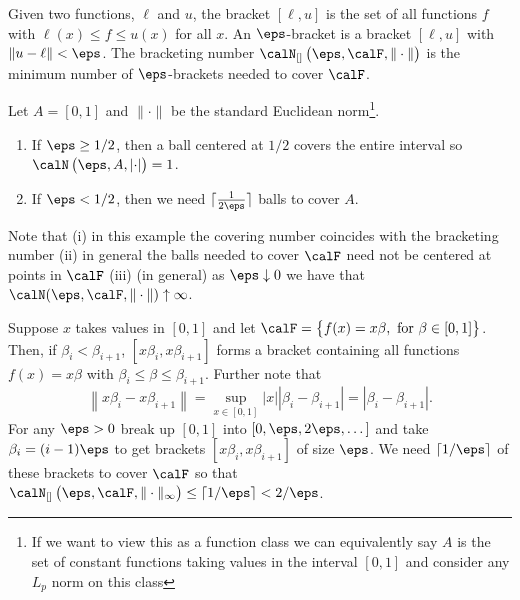 \begin{definition}
	\label{def:bracketing}
	Given two functions, \(\ell\) and \(u\), the bracket \([\ell,u]\) is the set of all functions  \(f\) with  \(\ell(x)\leq f\leq u(x)\) for all \(x\). An  \(\eps\)-bracket is a bracket  \([\ell,u]\) with  \(\|u-\ell\|< \eps\). The bracketing number \(\calN_{[]}\left(\eps,\calF,\|\cdot\|\right)\) is the minimum number of \(\eps\)-brackets needed to cover  \(\calF\).
\end{definition}

\begin{example}
	\label{ex:covering}
	Let \(A = [0,1]\) and  \(\|\cdot\|\) be the standard Euclidean norm\footnote{If we want to view this as a function class we can equivalently say \(A\) is the set of constant functions taking values in the interval  \([0,1]\) and consider any \(L_p\) norm on this class}.
	\begin{enumerate}
		\item If \(\eps \geq 1/2\), then a ball centered at  \(1/2\) covers the entire interval so  \(\calN\left(\eps,A,\left|\cdot\right|\right) = 1\).
		\item If \(\eps < 1/2\), then we need \(\lceil \frac{1}{2\eps}\rceil\) balls to cover \(A\).
	\end{enumerate}
	Note that (i) in this example the covering number coincides with the bracketing number (ii) in general the balls needed to cover \(\calF\) need not be centered at points in \(\calF\) (iii) (in general) as \(\eps\downarrow 0\) we have that  \(\calN(\eps,\calF,\|\cdot\|)\uparrow\infty\). 
\end{example}

\begin{example}
	\label{ex:brackering}
	Suppose \(x\) takes values in  \([0,1]\) and let \(\calF = \left\{f(x)=x\beta,\text{ for }\beta \in [0,1]\right\}\). Then, if \(\beta_i < \beta_{i+1}\),  \([x\beta_i, x\beta_{i+1}]\) forms a bracket containing all functions  \(f(x)=x\beta\) with  \(\beta_i \leq \beta\leq \beta_{i+1}\). Further note that \[
		\left\|x\beta_i - x\beta_{i+1}\right\| = \sup_{x\in[0,1]}|x||\beta_i-\beta_{i+1}| = |\beta_i -\beta_{i+1}|
	.\] 
	For any \(\eps>0\) break up  \([0,1]\) into  \([0,\eps,2\eps,\dots]\) and take \(\beta_i = (i-1)\eps\) to get brackets  \([x\beta_i,x\beta_{i+1}]\) of size \(\eps\). We need  \(\lceil 1/\eps\rceil\) of these brackets to cover  \(\calF\) so that  \(\calN_{[]}\left(\eps,\calF,\|\cdot\|_\infty\right)\leq \lceil 1/\eps\rceil < 2/\eps\).
\end{example}

